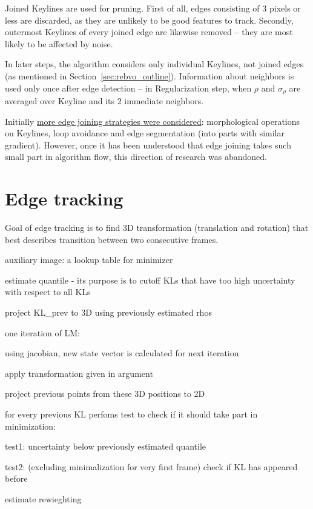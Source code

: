 Joined Keylines are used for pruning. First of all, edges consisting of 3 pixels or less are discarded, as they are unlikely to be good features to track. Secondly, outermost Keylines of every joined edge are likewise removed -- they are most likely to be affected by noise.

In later steps, the algorithm considers only individual Keylines, not joined edges (as mentioned in Section~\ref{sec:rebvo_outline}). Information about neighbors is used only once after edge detection -- in Regularization step, when $\rho$ and $\sigma_{\rho}$
are averaged over Keyline and its 2 immediate neighbors.

Initially \underline{more edge joining strategies were considered}: morphological operations on Keylines, loop avoidance and edge segmentation (into parts with similar gradient). However, once it has been understood that edge joining takes such small part in algorithm flow, this direction of research was abandoned.



\section{Edge tracking}

Goal of edge tracking is to find 3D transformation (translation and rotation) that best describes transition between two consecutive frames.



auxiliary image: a lookup table for minimizer

estimate quantile - its purpose is to cutoff KLs that have too high uncertainty with respect to all KLs

project KL\_prev to 3D using previously estimated rhos

one iteration of LM:

    using jacobian, new state vector is calculated for next iteration

    apply transformation given in argument

    project previous points from these 3D positions to 2D

    for every previous KL perfoms test to check if it should take part in minimization:

       test1: uncertainty below previously estimated quantile

	 test2: (excluding minimalization for very first frame) check if KL has appeared before

     estimate rewieghting

